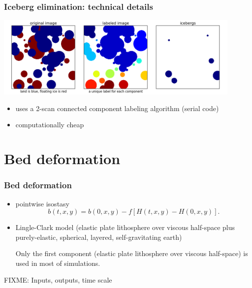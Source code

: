 \documentclass[hide notes,intlimits]{beamer}
\begin{document}
\begin{frame}
  \frametitle{Iceberg elimination: technical details}

  \begin{center}
    \includegraphics[width=0.9\textwidth]{icebergs.png}
  \end{center}

  \begin{itemize}
  \item uses a 2-scan connected component labeling algorithm (serial code)
  \item computationally cheap
  \end{itemize}
\end{frame}

\section{Bed deformation}
\label{sec:bed-deformation}

\begin{frame}
  \frametitle{Bed deformation}

  \begin{itemize}
  \item pointwise isostasy
    \begin{equation}
      \label{eq:9}
      b(t,x,y) = b(0,x,y) - f \left[H(t,x,y) - H(0,x,y)\right].
    \end{equation}
  \item Lingle-Clark model (elastic plate lithosphere over viscous
    half-space plus purely-elastic, spherical, layered,
    self-gravitating earth)

    \medskip
    Only the first component (elastic plate lithosphere over viscous
    half-space) is used in most of simulations.
  \end{itemize}

  FIXME: Inputs, outputs, time scale
\end{frame}
\end{document}
